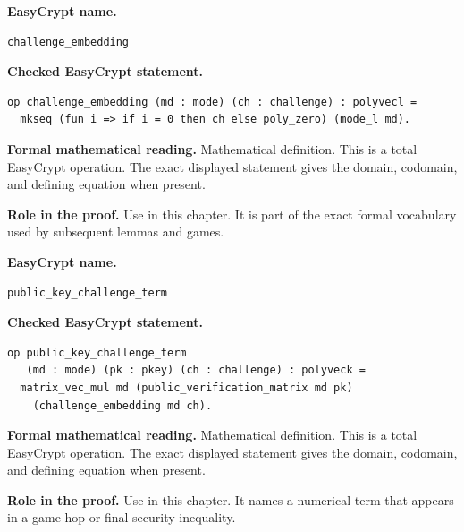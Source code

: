 \begin{formaldefinition}
\noindent\textbf{EasyCrypt name.}
\begin{lstlisting}[language=EasyCrypt,basicstyle=\ttfamily\scriptsize]
challenge_embedding
\end{lstlisting}
\noindent\textbf{Checked EasyCrypt statement.}
\begin{lstlisting}[language=EasyCrypt,basicstyle=\ttfamily\scriptsize]
op challenge_embedding (md : mode) (ch : challenge) : polyvecl =
  mkseq (fun i => if i = 0 then ch else poly_zero) (mode_l md).
\end{lstlisting}
\noindent\textbf{Formal mathematical reading.}
Mathematical definition. This is a total EasyCrypt operation.  The exact displayed statement gives the domain, codomain, and defining equation when present.

\noindent\textbf{Role in the proof.}
Use in this chapter. It is part of the exact formal vocabulary used by subsequent lemmas and games.

\end{formaldefinition}

\begin{formaldefinition}
\noindent\textbf{EasyCrypt name.}
\begin{lstlisting}[language=EasyCrypt,basicstyle=\ttfamily\scriptsize]
public_key_challenge_term
\end{lstlisting}
\noindent\textbf{Checked EasyCrypt statement.}
\begin{lstlisting}[language=EasyCrypt,basicstyle=\ttfamily\scriptsize]
op public_key_challenge_term
   (md : mode) (pk : pkey) (ch : challenge) : polyveck =
  matrix_vec_mul md (public_verification_matrix md pk)
    (challenge_embedding md ch).
\end{lstlisting}
\noindent\textbf{Formal mathematical reading.}
Mathematical definition. This is a total EasyCrypt operation.  The exact displayed statement gives the domain, codomain, and defining equation when present.

\noindent\textbf{Role in the proof.}
Use in this chapter. It names a numerical term that appears in a game-hop or final security inequality.

\end{formaldefinition}

